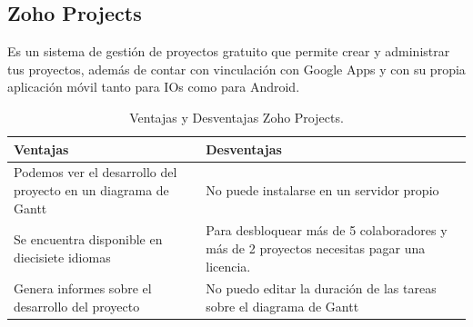 \subsection{Zoho Projects }  
Es un sistema de gestión de proyectos gratuito que permite crear y administrar tus proyectos, además de contar con vinculación con Google Apps y con su propia aplicación móvil tanto para IOs como para Android.\cite{M. Trow}
\newline \newline
\begin{table}[htbp]
\begin{center}
\begin{tabular}{|p{85mm}|p{85mm}|}
\hline
Ventajas & Desventajas 
\\
\hline \hline

Podemos ver el desarrollo del proyecto en un diagrama de Gantt  & No puede instalarse en un servidor propio 
\\ \hline 
Se encuentra disponible en diecisiete idiomas & Para desbloquear más de 5 colaboradores y más de 2 proyectos necesitas pagar una licencia. 
\\ \hline 
Genera informes sobre el desarrollo del proyecto & No puedo editar la duración de las tareas sobre el diagrama de Gantt 


\\ \hline

\end{tabular}
\caption{Ventajas y Desventajas Zoho Projects.}
\label{tabla:ventajas}
\end{center}
\end{table}


